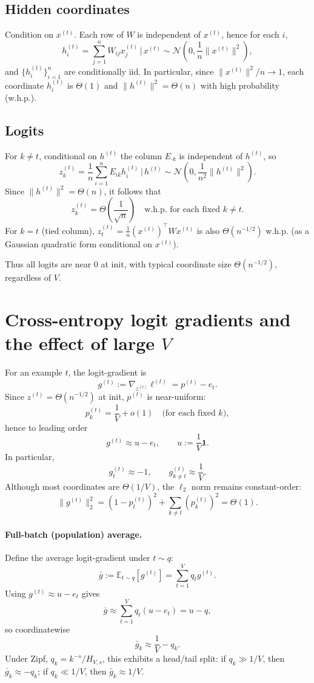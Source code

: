 \documentclass[11pt]{article}
\begin{document}
\subsection{Hidden coordinates}
Condition on $x^{(t)}$. Each row of $W$ is independent of $x^{(t)}$, hence for each $i$,
\[
h^{(t)}_i = \sum_{j=1}^n W_{ij}x^{(t)}_j \,\Big|\, x^{(t)}
\sim \mathcal{N}\!\left(0,\frac{1}{n}\|x^{(t)}\|^2\right),
\]
and $\{h^{(t)}_i\}_{i=1}^n$ are conditionally iid. In particular, since $\|x^{(t)}\|^2/n\to 1$,
each coordinate $h^{(t)}_i$ is $\Theta(1)$ and $\|h^{(t)}\|^2=\Theta(n)$ with high probability (w.h.p.).

\subsection{Logits}
For $k\neq t$, conditional on $h^{(t)}$ the column $E_{\cdot k}$ is independent of $h^{(t)}$, so
\[
z^{(t)}_k = \frac{1}{n}\sum_{i=1}^n E_{ik}h^{(t)}_i \,\Big|\, h^{(t)}
\sim \mathcal{N}\!\left(0,\frac{1}{n^2}\|h^{(t)}\|^2\right).
\]
Since $\|h^{(t)}\|^2=\Theta(n)$, it follows that
\[
z^{(t)}_k = \Theta\!\left(\frac{1}{\sqrt{n}}\right)\quad \text{w.h.p. for each fixed }k\neq t.
\]
For $k=t$ (tied column), $z^{(t)}_t = \frac{1}{n}(x^{(t)})^\top W x^{(t)}$ is also
$\Theta(n^{-1/2})$ w.h.p. (as a Gaussian quadratic form conditional on $x^{(t)}$).

Thus all logits are near $0$ at init, with typical coordinate size $\Theta(n^{-1/2})$, regardless of $V$.

\section{Cross-entropy logit gradients and the effect of large $V$}

For an example $t$, the logit-gradient is
\[
g^{(t)} := \nabla_{z^{(t)}}\ell^{(t)} = p^{(t)} - e_t.
\]
Since $z^{(t)}=\Theta(n^{-1/2})$ at init, $p^{(t)}$ is near-uniform:
\[
p^{(t)}_k = \frac{1}{V} + o(1)\quad \text{(for each fixed }k\text{)},
\]
hence to leading order
\[
g^{(t)} \approx u - e_t,\qquad u:=\frac{1}{V}\mathbf{1}.
\]
In particular,
\[
g^{(t)}_t \approx -1,\qquad g^{(t)}_{k\neq t}\approx \frac{1}{V}.
\]
Although most coordinates are $\Theta(1/V)$, the $\ell_2$ norm remains constant-order:
\[
\|g^{(t)}\|_2^2 = (1-p^{(t)}_t)^2 + \sum_{k\neq t} (p^{(t)}_k)^2 = \Theta(1).
\]

\paragraph{Full-batch (population) average.}
Define the average logit-gradient under $t\sim q$:
\[
\bar g := \mathbb{E}_{t\sim q}[g^{(t)}] = \sum_{t=1}^V q_t g^{(t)}.
\]
Using $g^{(t)}\approx u-e_t$ gives
\[
\bar g \approx \sum_{t=1}^V q_t(u-e_t) = u-q,
\]
so coordinatewise
\[
\bar g_k \approx \frac{1}{V} - q_k.
\]
Under Zipf, $q_k = k^{-s}/H_{V,s}$, this exhibits a head/tail split:
if $q_k\gg 1/V$, then $\bar g_k\approx -q_k$; if $q_k\ll 1/V$, then $\bar g_k\approx 1/V$.
\end{document}
